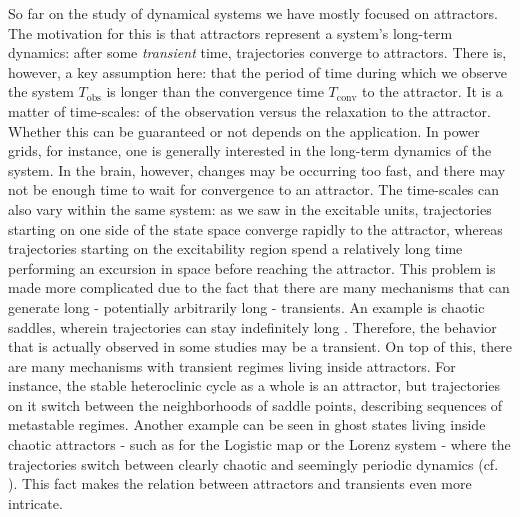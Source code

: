 So far on the study of dynamical systems we have mostly focused on attractors. The motivation for this is that attractors represent a system's long-term dynamics: after some \textit{transient} time, trajectories converge to attractors. There is, however, a key assumption here: that the period of time during which we observe the system $T_\mathrm{obs}$ is longer than the convergence time $T_\mathrm{conv}$ to the attractor. It is a matter of time-scales: of the observation versus the relaxation to the attractor. Whether this can be guaranteed or not depends on the application. In power grids, for instance, one is generally interested in the long-term dynamics of the system. In the brain, however, changes may be occurring too fast, and there may not be enough time to wait for convergence to an attractor. The time-scales can also vary within the same system: as we saw in the excitable units, trajectories starting on one side of the state space converge rapidly to the attractor, whereas trajectories starting on the excitability region spend a relatively long time performing an excursion in space before reaching the attractor. This problem is made more complicated due to the fact that there are many mechanisms that can generate long - potentially arbitrarily long - transients. An example is chaotic saddles, wherein trajectories can stay indefinitely long \cite{lai2009transient}. Therefore, the behavior that is actually observed in some studies may be a transient. On top of this, there are many mechanisms with transient regimes living inside attractors. For instance, the stable heteroclinic cycle as a whole is an attractor, but trajectories on it switch between the neighborhoods of saddle points, describing sequences of metastable regimes. Another example can be seen in ghost states living inside chaotic attractors - such as for the Logistic map or the Lorenz system - where the trajectories switch between clearly chaotic and seemingly periodic dynamics (cf. ). This fact makes the relation between attractors and transients even more intricate.

